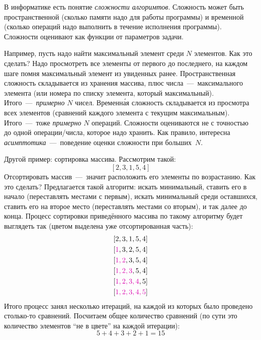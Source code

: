 \documentclass[a4paper,12pt]{article}
\begin{document}
  \begin{remark}
    В информатике есть понятие \emph{сложности алгоримтов}.
    Сложность может быть пространственной (сколько памяти надо для работы программы) и временной (сколько операций надо выполнить в течение исполнения программы).
    Сложности оценивают как функции от параметров задачи.
    
    Например, пусть надо найти максимальный элемент среди $N$ элементов.
    Как это сделать?
    Надо просмотреть все элементы от первого до последнего, на каждом шаге помня максимальный элемент из увиденных ранее.
    Пространственная сложность складывается из хранения массива, плюс числа~---~максимального элемента (или номера по списку элемента, который максимальный).
    Итого~---~\emph{примерно} $N$ чисел.
    Временн\'{а}я сложность складывается из просмотра всех элементов (сравнений каждого элемента с текущим максимальным).
    Итого~---~тоже \emph{примерно} $N$ операций.
    Сложности оцениваются не с точностью до одной операции/числа, которое надо хранить.
    Как правило, интересна \emph{асимптотика}~---~поведение оценки сложности при больших~$N$.
    
    Другой пример: сортировка массива.
    Рассмотрим такой:
    \[
      [2, 3, 1, 5, 4]
    \]
    Отсортировать массив~---~значит расположить его элементы по возрастанию.
    Как это сделать?
    Предлагается такой алгоритм: искать минимальный, ставить его в начало (переставлять местами с первым), искать минимальный среди оставшихся, ставить его на второе место (переставлять местами со вторым), и так далее до конца.
    Процесс сортировки приведённого массива по такому алгоритму будет выглядеть так (цветом выделена уже отсортированная часть):
    \[
      \begin{aligned}
        &[2, 3, 1, 5, 4]\\
        &[\textcolor{pink}{1}, 3, 2, 5, 4]\\
        &[\textcolor{pink}{1, 2}, 3, 5, 4]\\
        &[\textcolor{pink}{1, 2, 3}, 5, 4]\\
        &[\textcolor{pink}{1, 2, 3, 4}, 5]\\
        &[\textcolor{pink}{1, 2, 3, 4, 5}]\\
      \end{aligned}
    \]
    Итого процесс занял несколько итераций, на каждой из которых было проведено столько-то сравнений.
    Посчитаем общее количество сравнений (по сути это количество элементов ``не в цвете'' на каждой итерации):
    \[
      5 + 4 + 3 + 2 + 1 = 15
    \]
    

\end{remark}
\end{document}
